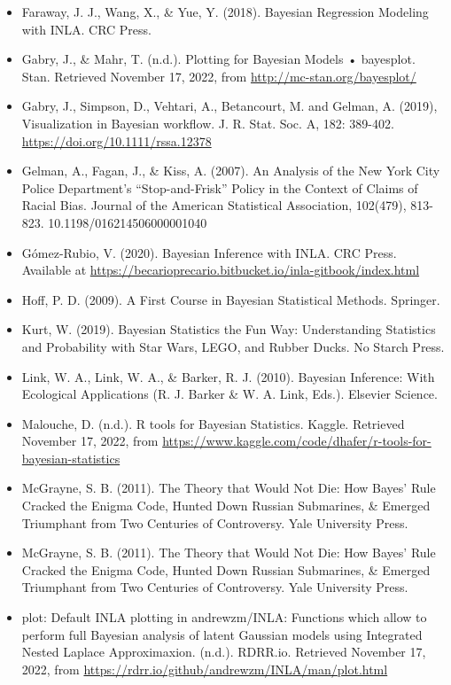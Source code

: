 \documentclass[
]{book}
\begin{document}
\begin{itemize}
\item
  Faraway, J. J., Wang, X., \& Yue, Y. (2018). Bayesian Regression Modeling with INLA. CRC Press.
\item
  Gabry, J., \& Mahr, T. (n.d.). Plotting for Bayesian Models • bayesplot. Stan. Retrieved November 17, 2022, from \url{http://mc-stan.org/bayesplot/}
\item
  Gabry, J., Simpson, D., Vehtari, A., Betancourt, M. and Gelman, A. (2019), Visualization in Bayesian workflow. J. R. Stat. Soc. A, 182: 389-402. \url{https://doi.org/10.1111/rssa.12378}
\item
  Gelman, A., Fagan, J., \& Kiss, A. (2007). An Analysis of the New York City Police Department's ``Stop-and-Frisk'' Policy in the Context of Claims of Racial Bias. Journal of the American Statistical Association, 102(479), 813-823. 10.1198/016214506000001040
\item
  Gómez-Rubio, V. (2020). Bayesian Inference with INLA. CRC Press. Available at \url{https://becarioprecario.bitbucket.io/inla-gitbook/index.html}
\item
  Hoff, P. D. (2009). A First Course in Bayesian Statistical Methods. Springer.
\item
  Kurt, W. (2019). Bayesian Statistics the Fun Way: Understanding Statistics and Probability with Star Wars, LEGO, and Rubber Ducks. No Starch Press.
\item
  Link, W. A., Link, W. A., \& Barker, R. J. (2010). Bayesian Inference: With Ecological Applications (R. J. Barker \& W. A. Link, Eds.). Elsevier Science.
\item
  Malouche, D. (n.d.). R tools for Bayesian Statistics. Kaggle. Retrieved November 17, 2022, from \url{https://www.kaggle.com/code/dhafer/r-tools-for-bayesian-statistics}
\item
  McGrayne, S. B. (2011). The Theory that Would Not Die: How Bayes' Rule Cracked the Enigma Code, Hunted Down Russian Submarines, \& Emerged Triumphant from Two Centuries of Controversy. Yale University Press.
\item
  McGrayne, S. B. (2011). The Theory that Would Not Die: How Bayes' Rule Cracked the Enigma Code, Hunted Down Russian Submarines, \& Emerged Triumphant from Two Centuries of Controversy. Yale University Press.
\item
  plot: Default INLA plotting in andrewzm/INLA: Functions which allow to perform full Bayesian analysis of latent Gaussian models using Integrated Nested Laplace Approximaxion. (n.d.). RDRR.io. Retrieved November 17, 2022, from \url{https://rdrr.io/github/andrewzm/INLA/man/plot.html}

\end{itemize}
\end{document}
